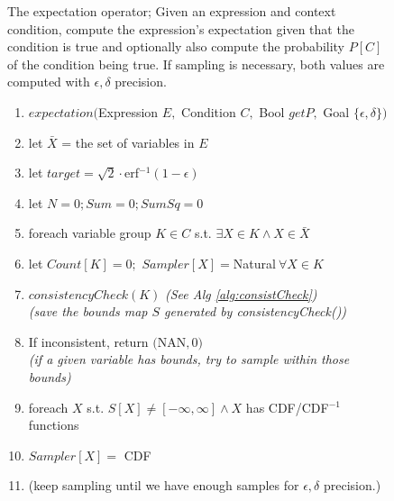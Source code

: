 \begin{figure}
\begin{algorithm} The expectation operator; Given an expression and context condition, compute  the expression's expectation given that the condition is true and optionally also compute the probability $P[C]$ of the condition being true.  If sampling is necessary, both values are computed with $\epsilon, \delta$ precision.
\label{alg:roadmap}
\footnotesize
\begin{enumerate}
\item $expectation($Expression $E,$ Condition $C,$ Bool $getP,$ Goal $\{\epsilon, \delta\})$
\item \hspace*{0.1in} let $\bar X$ = the set of variables in $E$
\item \hspace*{0.1in} let $target = \sqrt{2}\cdot $erf$^{-1}(1-\epsilon)$
\item \hspace*{0.1in} let $N = 0; Sum = 0; SumSq = 0$
\item \hspace*{0.1in} foreach variable group $K \in C$ s.t. $\exists X \in K \wedge X \in \bar X$ 
\item \hspace*{0.2in} let $Count[K] = 0;$ $Sampler[X] = $Natural$\ \forall X \in K$
\item \hspace*{0.2in} $consistencyCheck(K)$ \textit{(See Alg \ref{alg:consistCheck})}
\\    \hspace*{0.2in} \textit{(save the bounds map $S$ generated by consistencyCheck())}
\item \hspace*{0.2in} If inconsistent, return $($NAN$,0)$
\\    \hspace*{0.2in} \textit{(if a given variable has bounds, try to sample within those bounds)}
\item \hspace*{0.2in} foreach $X$ s.t. $S[X] \neq [-\infty, \infty] \wedge X$ has CDF/CDF$^{-1}$ functions
\item \hspace*{0.3in} $Sampler[X] =$ CDF
\item \hspace*{0.1in} (keep sampling until we have enough samples for $\epsilon, \delta$ precision.)

\end{enumerate}
\end{algorithm}
\end{figure}
